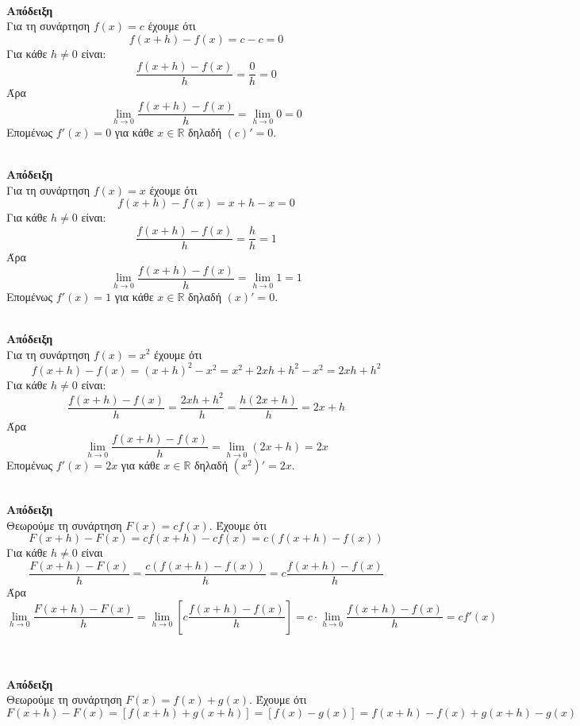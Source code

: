 \documentclass[11pt,a4paper]{article}
\newcommand{\kerkissans}[1]{{\fontfamily{maksf}\selectfont \textbf{#1}}}
\begin{document}
\begin{theory}[resume]
\item {}\\
\textbf{\kerkissans{Απόδειξη}}\\
Για τη συνάρτηση $f(x)=c$ έχουμε ότι
\[ f(x+h)-f(x)=c-c=0 \]
Για κάθε $h\neq 0$ είναι:
\[ \frac{f(x+h)-f(x)}{h}=\frac{0}{h}=0 \]
Άρα \[ \lim_{h\to 0}{\frac{f(x+h)-f(x)}{h}}=\lim_{h\to 0}{0}=0 \]
Επομένως $f'(x)=0$ για κάθε $x\in\mathbb{R}$ δηλαδή $(c)'=0$.
\item {}\\
\textbf{\kerkissans{Απόδειξη}}\\
Για τη συνάρτηση $f(x)=x$ έχουμε ότι
\[ f(x+h)-f(x)=x+h-x=0 \]
Για κάθε $h\neq 0$ είναι:
\[ \frac{f(x+h)-f(x)}{h}=\frac{h}{h}=1 \]
Άρα \[ \lim_{h\to 0}{\frac{f(x+h)-f(x)}{h}}=\lim_{h\to 0}{1}=1 \]
Επομένως $f'(x)=1$ για κάθε $x\in\mathbb{R}$ δηλαδή $(x)'=0$.
\item {}\\
\textbf{\kerkissans{Απόδειξη}}\\
Για τη συνάρτηση $f(x)=x^2$ έχουμε ότι
\[ f(x+h)-f(x)=(x+h)^2-x^2=x^2+2xh+h^2-x^2=2xh+h^2 \]
Για κάθε $h\neq 0$ είναι:
\[ \frac{f(x+h)-f(x)}{h}=\frac{2xh+h^2}{h}=\frac{h(2x+h)}{h}=2x+h \]
Άρα \[ \lim_{h\to 0}{\frac{f(x+h)-f(x)}{h}}=\lim_{h\to 0}{(2x+h)}=2x \]
Επομένως $f'(x)=2x$ για κάθε $x\in\mathbb{R}$ δηλαδή $(x^2)'=2x$.
\item {}\\
\textbf{\kerkissans{Απόδειξη}}\\
Θεωρούμε τη συνάρτηση $F(x)=cf(x)$. Έχουμε ότι
\[ F(x+h)-F(x)=cf(x+h)-cf(x)=c\left(f(x+h)-f(x)\right) \]
Για κάθε $h\neq 0$ είναι
\[ \frac{F(x+h)-F(x)}{h}=\frac{c\left(f(x+h)-f(x)\right)}{h}=c\frac{f(x+h)-f(x)}{h} \]
Άρα
\[ \lim_{h\to 0}{\frac{F(x+h)-F(x)}{h}}=\lim_{h\to 0}{\left[c\frac{f(x+h)-f(x)}{h}\right]}=c\cdot\lim_{h\to 0}{\frac{f(x+h)-f(x)}{h}}=cf'(x) \]
\item {}\\\\
\textbf{\kerkissans{Απόδειξη}}\\
Θεωρούμε τη συνάρτηση $F(x)=f(x)+g(x)$. Έχουμε ότι
\[ F(x+h)-F(x)=\left[f(x+h)+g(x+h)\right]=\left[f(x)-g(x)\right]=f(x+h)-f(x)+g(x+h)-g(x) \]

\end{theory}
\end{document}
